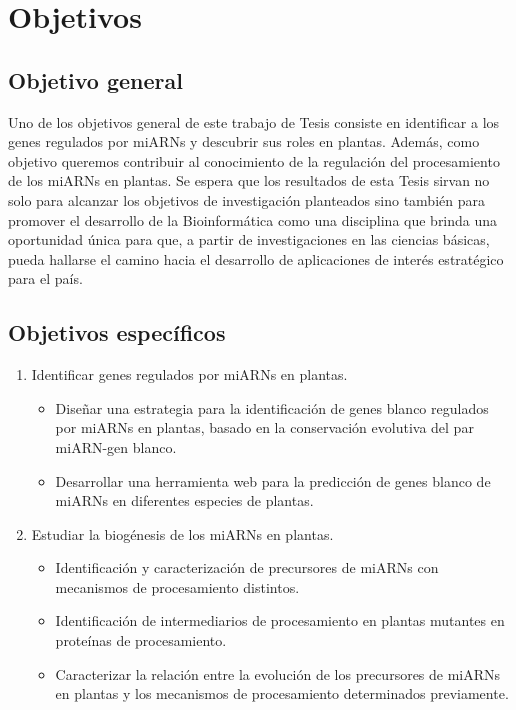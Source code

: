 \setcounter{chapter}{2}
\chapter*{Objetivos} 

\section{Objetivo general} 

Uno de los objetivos general de este trabajo de Tesis consiste en identificar a los genes regulados por miARNs y descubrir sus roles en plantas.
Además, como objetivo queremos contribuir al conocimiento de la regulación del procesamiento de los miARNs en plantas.
Se espera que los resultados de esta Tesis sirvan no solo para alcanzar los objetivos de investigación planteados sino también para promover el desarrollo de la Bioinformática como una disciplina que brinda una oportunidad única para que, a partir de investigaciones en las ciencias básicas, pueda hallarse el camino hacia el desarrollo de aplicaciones de interés estratégico para el país.

\section{Objetivos específicos}

\begin{enumerate}
    \item Identificar genes regulados por miARNs en plantas.
    \begin{itemize}
        \item Diseñar una estrategia para la identificación de genes blanco regulados por miARNs en plantas, basado en la conservación evolutiva del par miARN-gen blanco.
        \item Desarrollar una herramienta web para la predicción de genes blanco de miARNs en diferentes especies de plantas.		
    \end{itemize}
    \item Estudiar la biogénesis de los miARNs en plantas.
    \begin{itemize}
		\item Identificación y caracterización de precursores de miARNs con mecanismos de procesamiento distintos.
		\item Identificación de intermediarios de procesamiento en plantas mutantes en proteínas de procesamiento.
        \item Caracterizar la relación entre la evolución de los precursores de miARNs en plantas y los mecanismos de procesamiento determinados previamente.
    \end{itemize}
\end{enumerate}
